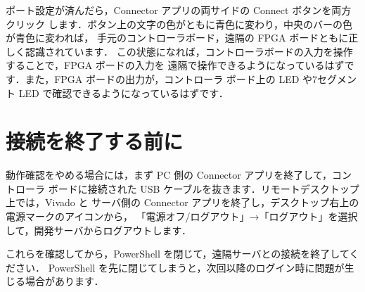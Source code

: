 ポート設定が済んだら，Connector アプリの両サイドの Connect ボタンを両方クリック
します．ボタン上の文字の色がともに青色に変わり，中央のバーの色が青色に変われば，
手元のコントローラボード，遠隔の FPGA ボードともに正しく認識されています．
この状態になれば，コントローラボードの入力を操作することで，FPGA ボードの入力を
遠隔で操作できるようになっているはずです．また，FPGA ボードの出力が，コントローラ
ボード上の LED や7セグメント LED で確認できるようになっているはずです．

\section{接続を終了する前に}

動作確認をやめる場合には，まず PC 側の Connector アプリを終了して，コントローラ
ボードに接続された USB ケーブルを抜きます．リモートデスクトップ上では，Vivado と
サーバ側の Connector アプリを終了し，デスクトップ右上の電源マークのアイコンから，
「電源オフ/ログアウト」→「ログアウト」を選択して，開発サーバからログアウトします．

これらを確認してから，PowerShell を閉じて，遠隔サーバとの接続を終了してください．
PowerShell を先に閉じてしまうと，次回以降のログイン時に問題が生じる場合があります．

